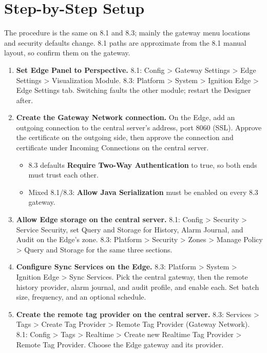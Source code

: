 \section{Step-by-Step Setup}
The procedure is the same on 8.1 and 8.3; mainly the gateway menu locations and security defaults change. 8.1 paths are approximate from the 8.1 manual layout, so confirm them on the gateway.
\begin{enumerate}[itemsep=2pt]
  \item \textbf{Set Edge Panel to Perspective.} 8.1: Config \textgreater{} Gateway Settings \textgreater{} Edge Settings \textgreater{} Visualization Module. 8.3: Platform \textgreater{} System \textgreater{} Ignition Edge \textgreater{} Edge Settings tab. Switching faults the other module; restart the Designer after.
  \item \textbf{Create the Gateway Network connection.} On the Edge, add an outgoing connection to the central server's address, port 8060 (SSL). Approve the certificate on the outgoing side, then approve the connection and certificate under Incoming Connections on the central server.
  \begin{itemize}[itemsep=1pt]
    \item 8.3 defaults \textbf{Require Two-Way Authentication} to true, so both ends must trust each other.
    \item Mixed 8.1/8.3: \textbf{Allow Java Serialization} must be enabled on every 8.3 gateway.
  \end{itemize}
  \item \textbf{Allow Edge storage on the central server.} 8.1: Config \textgreater{} Security \textgreater{} Service Security, set Query and Storage for History, Alarm Journal, and Audit on the Edge's zone. 8.3: Platform \textgreater{} Security \textgreater{} Zones \textgreater{} Manage Policy \textgreater{} Query and Storage for the same three sections.
  \item \textbf{Configure Sync Services on the Edge.} 8.3: Platform \textgreater{} System \textgreater{} Ignition Edge \textgreater{} Sync Services. Pick the central gateway, then the remote history provider, alarm journal, and audit profile, and enable each. Set batch size, frequency, and an optional schedule.
  \item \textbf{Create the remote tag provider on the central server.} 8.3: Services \textgreater{} Tags \textgreater{} Create Tag Provider \textgreater{} Remote Tag Provider (Gateway Network). 8.1: Config \textgreater{} Tags \textgreater{} Realtime \textgreater{} Create new Realtime Tag Provider \textgreater{} Remote Tag Provider. Choose the Edge gateway and its provider.

\end{enumerate}
